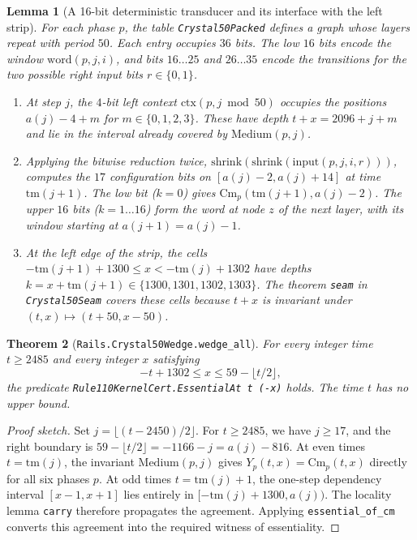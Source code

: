 \documentclass[11pt, a4paper]{article}
\newtheorem{theorem}{Theorem}[section]
\newtheorem{lemma}[theorem]{Lemma}
\begin{document}
\begin{lemma}[A 16-bit deterministic transducer and its interface with the left strip]\label{lem:transducer}
For each phase $p$, the table \texttt{Crystal50Packed} defines a graph whose layers repeat with period $50$. Each entry occupies $36$ bits. The low $16$ bits encode the window $\mathrm{word}(p, j, i)$, and bits $16\dots 25$ and $26\dots 35$ encode the transitions for the two possible right input bits $r \in \{0, 1\}$.
\begin{enumerate}[label=(\alph*)]
    \item At step $j$, the $4$-bit left context $\mathrm{ctx}(p, j \bmod 50)$ occupies the positions $a(j) - 4 + m$ for $m \in \{0, 1, 2, 3\}$. These have depth $t + x = 2096 + j + m$ and lie in the interval already covered by $\mathrm{Medium}(p, j)$.
    \item Applying the bitwise reduction twice, $\mathrm{shrink}(\mathrm{shrink}(\mathrm{input}(p, j, i, r)))$, computes the $17$ configuration bits on $[a(j)-2, a(j)+14]$ at time $\mathrm{tm}(j+1)$. The low bit ($k=0$) gives $\mathrm{Cm}_p(\mathrm{tm}(j+1), a(j) - 2)$. The upper $16$ bits ($k=1\dots 16$) form the word at node $z$ of the next layer, with its window starting at $a(j+1) = a(j) - 1$.
    \item At the left edge of the strip, the cells $-\mathrm{tm}(j+1) + 1300 \le x < -\mathrm{tm}(j) + 1302$ have depths $k = x + \mathrm{tm}(j+1) \in \{1300,1301,1302,1303\}$. The theorem \texttt{seam} in \texttt{Crystal50Seam} covers these cells because $t + x$ is invariant under $(t, x) \mapsto (t + 50, x - 50)$.
\end{enumerate}
\end{lemma}

\begin{theorem}[\texttt{Rails.Crystal50Wedge.wedge\_all}]\label{thm:wedge_all}
For every integer time $t \ge 2485$ and every integer $x$ satisfying
\begin{equation}\label{eq:wedge_region}
-t + 1302 \le x \le 59 - \lfloor t/2 \rfloor,
\end{equation}
the predicate \texttt{Rule110KernelCert.EssentialAt t (-x)} holds. The time $t$ has no upper bound.
\end{theorem}

\begin{proof}[Proof sketch]
Set $j = \lfloor (t - 2450) / 2 \rfloor$. For $t \ge 2485$, we have $j \ge 17$, and the right boundary is $59 - \lfloor t/2 \rfloor = -1166 - j = a(j) - 816$. At even times $t = \mathrm{tm}(j)$, the invariant $\mathrm{Medium}(p, j)$ gives $Y_p(t, x) = \mathrm{Cm}_p(t, x)$ directly for all six phases $p$. At odd times $t = \mathrm{tm}(j) + 1$, the one-step dependency interval $[x - 1, x + 1]$ lies entirely in $[-\mathrm{tm}(j) + 1300, a(j))$. The locality lemma \texttt{carry} therefore propagates the agreement. Applying \texttt{essential\_of\_cm} converts this agreement into the required witness of essentiality.
\end{proof}
\end{document}
